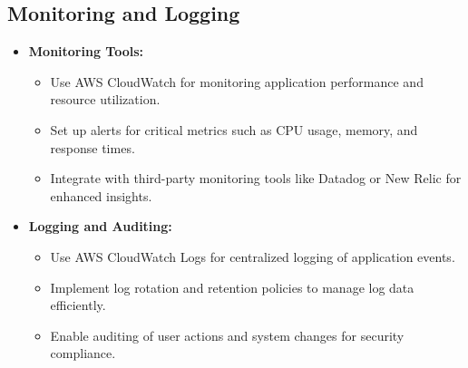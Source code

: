 \subsection{Monitoring and Logging}
\begin{itemize}[leftmargin=*]
    \item \textbf{Monitoring Tools:}
    \begin{itemize}
        \item Use AWS CloudWatch for monitoring application performance and resource utilization.
        \item Set up alerts for critical metrics such as CPU usage, memory, and response times.
        \item Integrate with third-party monitoring tools like Datadog or New Relic for enhanced insights.
    \end{itemize}
    
    \item \textbf{Logging and Auditing:}
    \begin{itemize}
        \item Use AWS CloudWatch Logs for centralized logging of application events.
        \item Implement log rotation and retention policies to manage log data efficiently.
        \item Enable auditing of user actions and system changes for security compliance.
    \end{itemize}
\end{itemize}